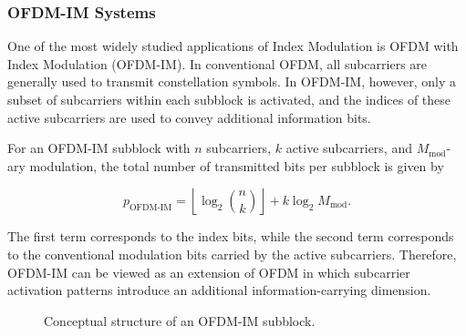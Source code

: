 \subsubsection{OFDM-IM Systems}

One of the most widely studied applications of Index Modulation is OFDM with Index Modulation (OFDM-IM). In conventional OFDM, all subcarriers are generally used to transmit constellation symbols. In OFDM-IM, however, only a subset of subcarriers within each subblock is activated, and the indices of these active subcarriers are used to convey additional information bits.

For an OFDM-IM subblock with \(n\) subcarriers, \(k\) active subcarriers, and \(M_{\mathrm{mod}}\)-ary modulation, the total number of transmitted bits per subblock is given by

\begin{equation}
p_{\mathrm{OFDM\text{-}IM}}
=
\left\lfloor \log_2 \binom{n}{k} \right\rfloor
+
k \log_2 M_{\mathrm{mod}}.
\end{equation}

The first term corresponds to the index bits, while the second term corresponds to the conventional modulation bits carried by the active subcarriers. Therefore, OFDM-IM can be viewed as an extension of OFDM in which subcarrier activation patterns introduce an additional information-carrying dimension.

\begin{figure}[H]
\centering


\caption{Conceptual structure of an OFDM-IM subblock.}
\label{fig:ofdm_im_subblock}
\end{figure}


